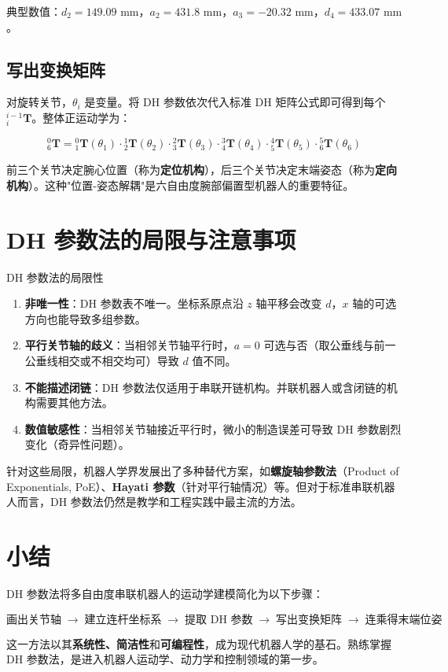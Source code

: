 典型数值：$d_2 = 149.09\text{ mm}$，$a_2 = 431.8\text{ mm}$，$a_3 = -20.32\text{ mm}$，$d_4 = 433.07\text{ mm}$。

\subsection{写出变换矩阵}

对旋转关节，$\theta_i$ 是变量。将 DH 参数依次代入标准 DH 矩阵公式即可得到每个 ${}^{i-1}_{i}\mathbf{T}$。整体正运动学为：

\[
{}^{0}_{6}\mathbf{T} = {}^{0}_{1}\mathbf{T}(\theta_1) \cdot {}^{1}_{2}\mathbf{T}(\theta_2) \cdot {}^{2}_{3}\mathbf{T}(\theta_3) \cdot {}^{3}_{4}\mathbf{T}(\theta_4) \cdot {}^{4}_{5}\mathbf{T}(\theta_5) \cdot {}^{5}_{6}\mathbf{T}(\theta_6)
\]

前三个关节决定腕心位置（称为\textbf{定位机构}），后三个关节决定末端姿态（称为\textbf{定向机构}）。这种"位置-姿态解耦"是六自由度腕部偏置型机器人的重要特征。

\section{DH 参数法的局限与注意事项}

\begin{myTheorem}{DH 参数法的局限性}
	\begin{enumerate}
		\item \textbf{非唯一性}：DH 参数表不唯一。坐标系原点沿 $z$ 轴平移会改变 $d$，$x$ 轴的可选方向也能导致多组参数。
		\item \textbf{平行关节轴的歧义}：当相邻关节轴平行时，$a=0$ 可选与否（取公垂线与前一公垂线相交或不相交均可）导致 $d$ 值不同。
		\item \textbf{不能描述闭链}：DH 参数法仅适用于串联开链机构。并联机器人或含闭链的机构需要其他方法。
		\item \textbf{数值敏感性}：当相邻关节轴接近平行时，微小的制造误差可导致 DH 参数剧烈变化（奇异性问题）。
	\end{enumerate}
\end{myTheorem}

针对这些局限，机器人学界发展出了多种替代方案，如\textbf{螺旋轴参数法}（Product of Exponentials, PoE）、\textbf{Hayati 参数}（针对平行轴情况）等。但对于标准串联机器人而言，DH 参数法仍然是教学和工程实践中最主流的方法。

\section{小结}

DH 参数法将多自由度串联机器人的运动学建模简化为以下步骤：

\[
\boxed{\text{画出关节轴}} \;\to\; \boxed{\text{建立连杆坐标系}} \;\to\; \boxed{\text{提取 DH 参数}} \;\to\; \boxed{\text{写出变换矩阵}} \;\to\; \boxed{\text{连乘得末端位姿}}
\]

这一方法以其\textbf{系统性、简洁性}和\textbf{可编程性}，成为现代机器人学的基石。熟练掌握 DH 参数法，是进入机器人运动学、动力学和控制领域的第一步。
